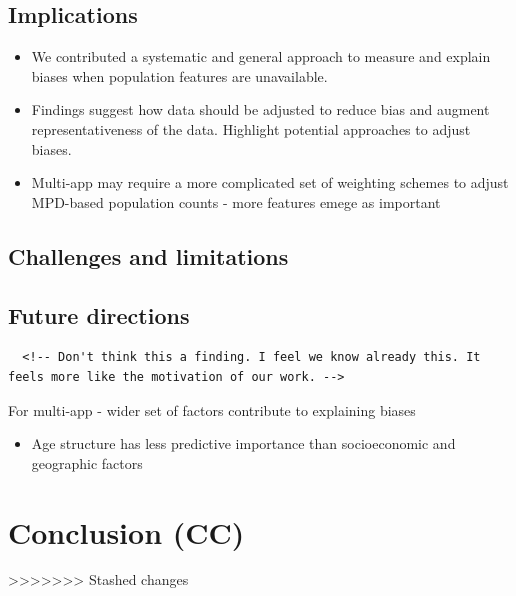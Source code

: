 \documentclass[]{rsos}%
\providecommand{\tightlist}{%
  \setlength{\itemsep}{0pt}\setlength{\parskip}{0pt}}
\begin{document}
\subsection{Implications}\label{implications}

\begin{itemize}
\item
  We contributed a systematic and general approach to measure and
  explain biases when population features are unavailable.
\item
  Findings suggest how data should be adjusted to reduce bias and
  augment representativeness of the data. Highlight potential
  approaches to adjust biases.
\item
  Multi-app may require a more complicated set of weighting schemes to
  adjust MPD-based population counts - more features emege as
  important
\end{itemize}

\subsection{Challenges and limitations}\label{challenges-and-limitations}

\subsection{Future directions}\label{future-directions}

\begin{verbatim}
  <!-- Don't think this a finding. I feel we know already this. It feels more like the motivation of our work. -->
\end{verbatim}

For multi-app - wider set of factors contribute to explaining biases

\begin{itemize}
\tightlist
\item
  Age structure has less predictive importance than socioeconomic and
  geographic factors\\
\end{itemize}

\section{Conclusion (CC)}\label{conclusion-cc}

>>>>>>> Stashed changes









\end{document}

